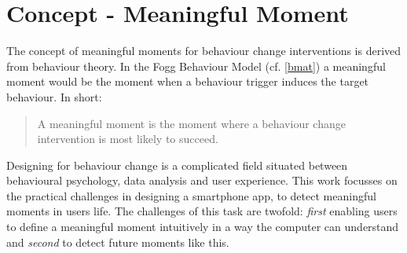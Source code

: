 \documentclass[a4paper]{report}
\begin{document}



\section{Concept - Meaningful Moment}

The concept of meaningful moments for behaviour change interventions is derived from behaviour theory. In the Fogg Behaviour Model \parencite{Fogg2009} (cf. \autoref{bmat}) a meaningful moment would be the moment when a behaviour trigger induces the target behaviour. In short: 

\begin{quote}
  A meaningful moment is the moment where a behaviour change intervention is most likely to succeed.
\end{quote}

Designing for behaviour change is a complicated field situated between behavioural psychology, data analysis and user experience. This work focusses on the practical challenges in designing a smartphone app, to detect meaningful moments in users life. The challenges of this task are twofold: \emph{first} enabling users to define a meaningful moment intuitively in a way the computer can understand and \emph{second} to detect future moments like this.
\end{document}
